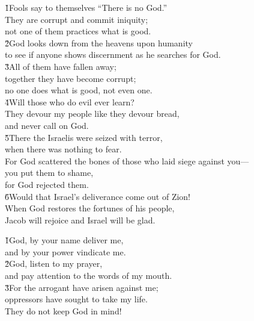 \begin{poetry}
\poeml \v{1}Fools say to themselves ``There is no God.'' \\
\poemll    They are corrupt and commit iniquity; \\
\poemlll       not one of them practices what is good. \\
\poeml \v{2}God looks down from the heavens upon humanity \\
\poemll    to see if anyone shows discernment as he searches for God. \\
\poeml \v{3}All of them have fallen away; \\
\poemll    together they have become corrupt; \\
\poemlll       no one does what is good, not even one. \\
\poeml \v{4}Will those who do evil ever learn? \\
\poemll    They devour my people like they devour bread, \\
\poemlll       and never call on God. \\
\poeml \v{5}There the Israelis were seized with terror, \\
\poemll    when there was nothing to fear. \\
\poeml For God scattered the bones of those who laid siege against you--- \\
\poemll    you put them to shame, \\
\poemlll       for God rejected them. \\
\poeml \v{6}Would that Israel's deliverance come out of Zion! \\
\poemll    When God restores the fortunes of his people, \\
\poemlll       Jacob will rejoice and Israel will be glad.
\end{poetry}

\begin{poetry}
\poeml \v{1}God, by your name deliver me, \\
\poemll    and by your power vindicate me. \\
\poeml \v{2}God, listen to my prayer, \\
\poemll    and pay attention to the words of my mouth. \\
\poeml \v{3}For the arrogant have arisen against me; \\
\poemll    oppressors have sought to take my life. \\
\poeml They do not keep God in mind!
\end{poetry}

